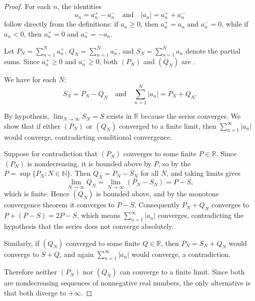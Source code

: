 \begin{proof}
    For each $n$, the identities
    $$a_n = a_n^+ - a_n^- \quad \text{and} \quad |a_n| = a_n^+ + a_n^-$$
    follow directly from the definitions: if $a_n \geq 0$, then $a_n^+ = a_n$ and $a_n^- = 0$, while if $a_n < 0$, then $a_n^+ = 0$ and $a_n^- = -a_n$.

    Let $P_N = \sum_{n=1}^N a_n^+$, $Q_N = \sum_{n=1}^N a_n^-$, and $S_N = \sum_{n=1}^N a_n$ denote the partial sums. Since $a_n^+ \geq 0$ and $a_n^- \geq 0$, both $(P_N)$ and $(Q_N)$ are .

    We have for each $N$:
    $$S_N = P_N - Q_N \quad \text{and} \quad \sum_{n=1}^N |a_n| = P_N + Q_N.$$

    By hypothesis, $\lim_{N\to\infty} S_N = S$ exists in $\mathbb{R}$ because the series converges. We show that if either $(P_N)$ or $(Q_N)$ converged to a finite limit, then $\sum_{n=1}^\infty |a_n|$ would converge, contradicting conditional convergence.

    Suppose for contradiction that $(P_N)$ converges to some finite $P \in \mathbb{R}$. Since $(P_N)$ is nondecreasing, it is bounded above by $P$, so by the  $P = \sup\{P_N : N \in \mathbb{N}\}$. Then $Q_N = P_N - S_N$ for all $N$, and taking limits gives
    $$\lim_{N\to\infty} Q_N = \lim_{N\to\infty} (P_N - S_N) = P - S,$$
    which is finite. Hence $(Q_N)$ is bounded above, and by the monotone convergence theorem it converges to $P - S$. Consequently $P_N + Q_N$ converges to $P + (P - S) = 2P - S$, which means $\sum_{n=1}^\infty |a_n|$ converges, contradicting the hypothesis that the series does not converge absolutely.

    Similarly, if $(Q_N)$ converged to some finite $Q \in \mathbb{R}$, then $P_N = S_N + Q_N$ would converge to $S + Q$, and again $\sum_{n=1}^\infty |a_n|$ would converge, a contradiction.

    Therefore neither $(P_N)$ nor $(Q_N)$ can converge to a finite limit. Since both are nondecreasing sequences of nonnegative real numbers, the only alternative is that both diverge to $+\infty$.
\end{proof}
